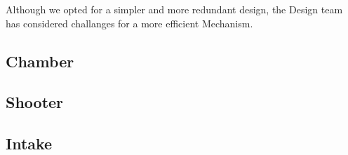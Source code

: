 Although we opted for a simpler and more redundant design, the Design team has considered challanges for a more efficient Mechanism. 
\subsection{Chamber}
\subsection{Shooter}
\subsection{Intake}